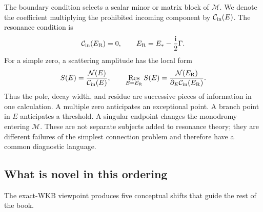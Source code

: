 The boundary condition selects a scalar minor or matrix block of
$\mathcal M$.  We denote the coefficient multiplying the prohibited incoming
component by $\mathcal{C}_{\mathrm{in}}(E)$.  The resonance condition is
\begin{equation}
  \mathcal{C}_{\mathrm{in}}(E_{\mathrm{R}})=0,
  \qquad
  E_{\mathrm{R}}=E_*-\frac{\mathrm{i}}{2}\Gamma .
  \label{eq:spine-resonance-condition}
\end{equation}
For a simple zero, a scattering amplitude has the local form
\begin{equation}
  S(E)=\frac{\mathcal N(E)}{\mathcal{C}_{\mathrm{in}}(E)},
  \qquad
  \operatorname*{Res}_{E=E_{\mathrm{R}}}S(E)
  =\frac{\mathcal N(E_{\mathrm{R}})}
  {\partial_E\mathcal{C}_{\mathrm{in}}(E_{\mathrm{R}})}.
  \label{eq:spine-residue}
\end{equation}
Thus the pole, decay width, and residue are successive pieces of information
in one calculation.  A multiple zero anticipates an exceptional point.  A
branch point in $E$ anticipates a threshold.  A singular endpoint changes
the monodromy entering $\mathcal M$.  These are not separate subjects added
to resonance theory; they are different failures of the simplest connection
problem and therefore have a common diagnostic language.

\subsection{What is novel in this ordering}
\label{subsec:novel-ordering}

The exact-WKB viewpoint produces five conceptual shifts that guide the rest
of the book.

